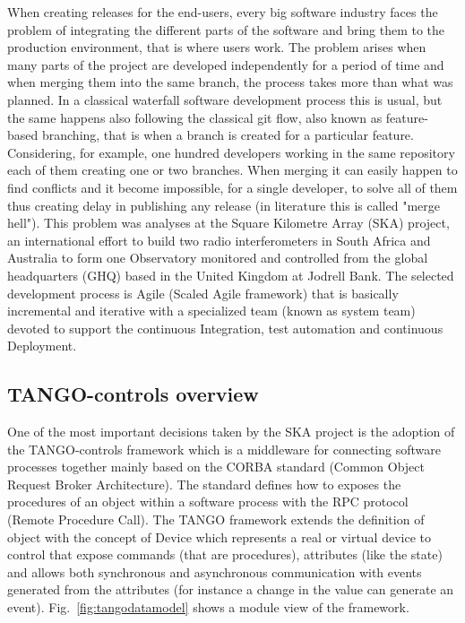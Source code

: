 \documentclass[a4paper]{spie}  %
\begin{document}
When creating releases for the end-users, every big software industry faces the problem of integrating the different parts of the software and bring them to the production environment, that is where users work. The problem arises when many parts of the project are developed independently for a period of time and when merging them into the same branch, the process takes more than what was planned. In a classical waterfall software development process this is usual, but the same happens also following the classical git flow, also known as feature-based branching, that is when a branch is created for a particular feature. Considering, for example, one hundred developers working in the same repository each of them creating one or two branches. When merging it can easily happen to find conflicts and it become impossible, for a single developer, to solve all of them thus creating delay in publishing any release (in literature this is called "merge hell").
This problem was analyses at the Square Kilometre Array (SKA) project, an international effort to build two radio interferometers in South Africa and Australia to form one Observatory monitored and controlled from the global headquarters (GHQ) based in the United Kingdom at Jodrell Bank.  
The selected development process is Agile (Scaled Agile framework) that is basically incremental and iterative with a specialized team (known as system team) devoted to support the continuous Integration, test automation and continuous Deployment.

\subsection{TANGO-controls overview}
One of the most important decisions taken by the SKA project is the adoption of the TANGO-controls\cite{tango-controls} framework which is a middleware for connecting software processes together mainly based on the CORBA standard (Common Object Request Broker Architecture). The standard defines how to exposes the procedures of an object within a software process with the RPC protocol (Remote Procedure Call).  The TANGO framework extends the definition of object with the concept of Device which represents a real or virtual device to control that expose commands (that are procedures), attributes (like the state) and allows both synchronous and asynchronous communication with events generated from the attributes (for instance a change in the value can generate an event). Fig.~\ref{fig:tangodatamodel}  shows a module view of the framework.
\end{document}
